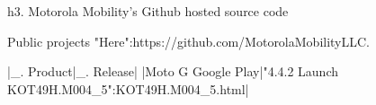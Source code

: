h3. Motorola Mobility's Github hosted source code

Public projects "Here":https://github.com/MotorolaMobilityLLC.

|_. Product|_. Release|
|Moto G Google Play|"4.4.2 Launch KOT49H.M004_5":KOT49H.M004_5.html|


